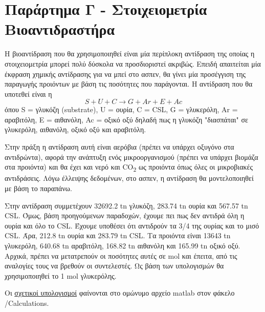 \documentclass[11pt]{article}
\begin{document}
\section{Παράρτημα Γ - Στοιχειομετρία Βιοαντιδραστήρα}
\label{sec:org7119c66}

Η βιοαντίδραση που θα χρησιμοποιηθεί είναι μία περίπλοκη αντίδραση της οποίας η στοιχειομετρία μπορεί πολύ δύσκολα να προσδιοριστεί ακριβώς. Επειδή απαιτείται μία έκφραση χημικής αντίδρασης για να μπεί στο ασπεν, θα γίνει μία προσέγγιση της παραγωγής προιόντων με βάση τις ποσότητες που παράγονται. Η αντίδραση που θα υποτεθεί είναι η
\[ S + U + C \rightarrow G + Ar + E + Ac\]
όπου S = γλυκόζη (substrate), U = ουρία, C = CSL, G = γλυκερόλη, Ar = αραβιτόλη, Ε = αιθανόλη, Ac = οξικό οξύ
δηλαδή πως η γλυκόζη "διασπάται" σε γλυκερόλη, αιθανόλη, οξικό οξύ και αραβιτόλη.

Στην πράξη η αντίδραση αυτή είναι αερόβια (πρέπει να υπάρχει οξυγόνο στα αντιδρώντα), αφορά την ανάπτυξη ενός μικροοργανισμού (πρέπει να υπάρχει βιομάζα στα προιόντα) και θα έχει και νερό και CO\textsubscript{2} ως προιόντα όπως όλες οι μικροβιακές αντιδράσεις. Λόγω έλλειψης δεδομένων, στο ασπεν, η αντίδραση θα μοντελοποιηθεί με βάση το παραπάνω.

Στην αντίδραση συμμετέχουν 32692.2 tn γλυκόζη, 283.74 tn ουρία και 567.57 tn CSL. Όμως, βάση προηγούμενων παραδοχών, έχουμε πει πως δεν αντιδρά όλη η ουρία και όλο το CSL. Έχουμε υποθέσει ότι αντιδρούν τα 3/4 της ουρίας και το μισό CSL. Άρα, 212.8 tn ουρία και 283.79 tn CSL. Τα προιόντα είναι 13643 tn γλυκερόλη, 640.68 tn αραβιτόλη, 168.82 tn αιθανόλη και 165.99 tn οξικό οξύ. Αρχικά, πρέπει να μετατρεπούν οι ποσότητες αυτές σε mol και έπειτα, από τις αναλογίες τους να βρεθούν οι συντελεστές. Ως βάση των υπολογισμών θα χρησιμοποιηθεί το 1 mol γλυκερόλης.

Οι \href{https://github.com/Vidianos-Giannitsis/Process-Design/blob/master/Calculations/bioreactor\_stoichiometry.m}{σχετικοί υπολογισμοί} φαίνονται στο ομώνυμο αρχείο matlab στον φάκελο /Calculations.
\end{document}
